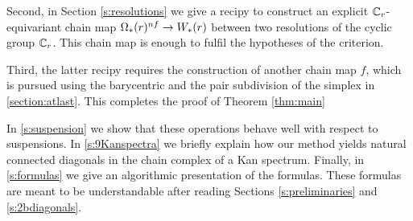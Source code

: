 Second, in Section \ref{s:resolutions} we give a recipy to construct an explicit $\mathbb{C}_r$-equivariant chain map $\Omega_*(r)^{nf} \to W_*(r)$ between two resolutions of the cyclic group $\mathbb{C}_r$. This chain map is enough to fulfil the hypotheses of the criterion.

Third, the latter recipy requires the construction of another chain map $f$, which is pursued using the barycentric and the pair subdivision of the simplex in \cref{section:atlast}. This completes the proof of Theorem \ref{thm:main}

In \cref{s:suspension} we show that these operations behave well with respect to suspensions.
In \cref{s:9Kanspectra} we briefly explain how our method yields natural connected diagonals in the chain complex of a Kan spectrum.
Finally, in \cref{s:formulas} we give an algorithmic presentation of the formulas.
These formulas are meant to be understandable after reading Sections \ref{s:preliminaries} and \ref{s:2bdiagonals}.